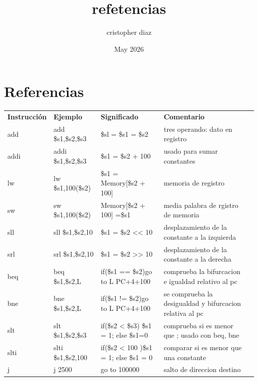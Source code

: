 \documentclass{article}
\title{refetencias}
\author{cristopher diaz}
\date{May 2026}
\begin{document}
    
\maketitle

\section{Referencias}
\centering
    \renewcommand{\arraystretch}{1.8} %
    \setlength{\tabcolsep}{12pt}      %
    
    \begin{tabular}{lllll} %
        \rowcolor{azulCeleste} %
        \textbf{\color{white}Instrucción} & 
        \textbf{\color{white}Ejemplo} & 
        \textbf{\color{white}Significado} & 
        \textbf{\color{white}Comentario} \\
        
        add & add \$s1,\$s2,\$s3  & \$sl = \$s1 = \$s2  & tres operando: dato en registro \\
        addi & addi \$s1,\$s2,\$s3  & \$s1 = \$s2 + 100 &  usado para sumar constantes \\
        lw & lw \$s1,100(\$s2)  & \$s1 = Memory[\$s2 + 100] &  memoria de registro \\
        sw & sw \$s1,100(\$s2)  &  Memory[\$s2 + 100] =\$s1 &  media palabra de rgistro de memoria\\
        sll & sll \$s1,\$s2,10  & \$s1 = \$s2 << 10 &  desplazamiento de la constante a la izquierda \\
         srl & srl \$s1,\$s2,10  & \$s1 = \$s2 >> 10 &  desplazamiento de la constante a la derecha\\
        beq & beq \$s1,\$s2,L  & if(\$s1 == \$s2)go to L PC+4+100 &  comprueba la bifurcacion e igualdad relativo al pc \\
        bne & bne \$s1,\$s2,L  & if(\$s1 != \$s2)go to L PC+4+100 &  se comprueba la desigualdad y bifurcacion relativa al pc \\
        slt & slt \$s1,\$s2,\$s3  & if(\$s2 < \$s3) \$s1 = 1; else \$s1=0 &  comprueba si es menor que ; usado con beq, bne \\
        slti & slti \$s1,\$s2,100  & if(\$s2 < 100 )\$s1 = 1; else \$s1 = 0 &  comparar si es menor que una constante \\
        j & j 2500  & go to 100000 &  salto de direccion destino  \\
    \end{tabular}
\end{document}
